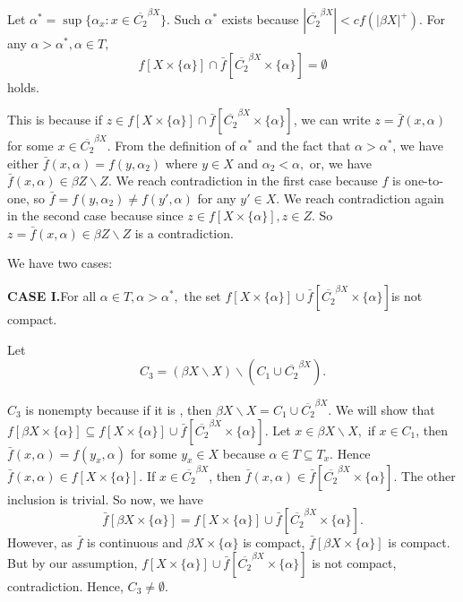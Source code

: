 \documentclass{article}
\begin{document}
Let $\alpha^* = \sup \{\alpha_x: x\in \overline{C_2}^{\beta X}\}.$ Such $\alpha^*$ exists because $\left| \overline{C_2}^{\beta X} \right| <cf(|\beta X|^+).$  For any $\alpha>\alpha^*, \alpha \in T,$
$$f\left[X\times \{\alpha\}\right] \cap \bar{f}\left[\overline{C_2}^{\beta X} \times \{\alpha\}\right] = \emptyset$$ holds. 

This is because if $z\in f\left[X\times \{\alpha\}\right] \cap \bar{f} \left[\overline{C_2}^{\beta X} \times \{\alpha\} \right]$, we can write $z=\bar{f}(x,\alpha)$ for some $x\in \overline{C_2}^{\beta X}$. From the definition of $\alpha^*$ and the fact that $\alpha>\alpha^*$, we have either $\bar{f}(x,\alpha)=f(y,\alpha_2)$ where $y\in X$ and $\alpha_2<\alpha,$ or, we have $\bar{f}(x,\alpha)\in \beta Z\backslash Z.$ We reach  contradiction in the first case because $f$ is one-to-one, so $\bar{f}=f(y,\alpha_2)\neq f(y',\alpha)$ for any $y'\in X.$ We reach contradiction again in the second case because since $z\in f\left[X\times\{\alpha\}\right], z\in Z.$ So $z=\bar{f}(x,\alpha)\in \beta Z\backslash Z $ is a contradiction. 

\vskip 25pt


We have two cases: 

\vskip 20pt

\textbf{CASE I.}For all $\alpha \in T, \alpha>\alpha^*,$ the set $f\left[X\times\{\alpha\}\right] \cup \bar{f}\left[\overline{C_2}^{\beta X} \times \{\alpha\}\right] $is not compact. 

\vskip 20pt

Let $$C_3=(\beta X\backslash X) \backslash (C_1\cup \overline{C_2}^{\beta X}).$$

$C_3$ is nonempty because if it is , then $\beta X\backslash X= C_1\cup \overline{C_2}^{\beta X}.$ We will show that $f\left[\beta X\times \{\alpha\} \right] \subseteq f\left[X\times\{\alpha\}\right]\cup\bar{f}\left[\overline{C_2}^{\beta X}\times\{\alpha\}\right].$ Let $x\in\beta X\backslash X,$ if $x\in C_1$, then $\bar{f}(x,\alpha)=f(y_x,\alpha)$ for some $y_x\in X$ because $\alpha\in T\subseteq T_x.$ Hence $\bar{f}(x,\alpha)\in f\left[X\times\{\alpha\}\right].$ If $x\in \overline{C_2}^{\beta X}$, then $\bar{f}(x,\alpha)\in \bar{f}\left[\overline{C_2}^{\beta X}\times \{\alpha\}\right].$ 
The other inclusion is trivial. So now, we have 
$$\bar{f}\left[\beta X\times \{\alpha\}\right]=f\left[X\times\{\alpha\}\right]\cup\bar{f}\left[\overline{C_2}^{\beta X} \times \{\alpha\}\right].$$
However, as $\bar{f}$ is continuous and $\beta X\times \{\alpha\}$ is compact, $\bar{f}\left[\beta X\times \{\alpha\}\right]$ is compact. But by our assumption, $f\left[X\times\{\alpha\}\right] \cup \bar{f}\left[\overline{C_2}^{\beta X} \times \{\alpha\}\right] $ is not compact, contradiction. Hence, $C_3\neq \emptyset.$
\end{document}
